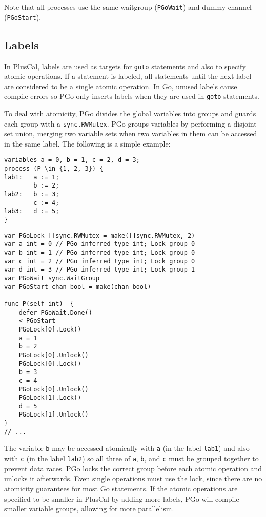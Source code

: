 Note that all processes use the same waitgroup (\texttt{PGoWait}) and dummy channel (\texttt{PGoStart}).

\subsection{Labels}
\label{sec:labels}
In PlusCal, labels are used as targets for \texttt{goto} statements and also to specify atomic operations. If a statement is labeled, all statements until the next label are considered to be a single atomic operation. In Go, unused labels cause compile errors so PGo only inserts labels when they are used in \texttt{goto} statements.

To deal with atomicity, PGo divides the global variables into groups and guards each group with a \texttt{sync.RWMutex}. PGo groups variables by performing a disjoint-set union, merging two variable sets when two variables in them can be accessed in the same label. The following is a simple example:

\begin{minipage}[t]{\textwidth}
\begin{lstlisting}[language=pcal]
variables a = 0, b = 1, c = 2, d = 3;
process (P \in {1, 2, 3}) {
lab1:   a := 1;
        b := 2;
lab2:   b := 3;
        c := 4;
lab3:   d := 5;
}
\end{lstlisting}
\end{minipage}

\begin{minipage}[t]{\textwidth}
\begin{lstlisting}[language=golang]
var PGoLock []sync.RWMutex = make([]sync.RWMutex, 2)
var a int = 0 // PGo inferred type int; Lock group 0
var b int = 1 // PGo inferred type int; Lock group 0
var c int = 2 // PGo inferred type int; Lock group 0
var d int = 3 // PGo inferred type int; Lock group 1
var PGoWait sync.WaitGroup
var PGoStart chan bool = make(chan bool)

func P(self int)  {
	defer PGoWait.Done()
	<-PGoStart
	PGoLock[0].Lock()
	a = 1
	b = 2
	PGoLock[0].Unlock()
	PGoLock[0].Lock()
	b = 3
	c = 4
	PGoLock[0].Unlock()
	PGoLock[1].Lock()
	d = 5
	PGoLock[1].Unlock()
}
// ...
\end{lstlisting}
\end{minipage}
The variable \texttt{b} may be accessed atomically with \texttt{a} (in the label \texttt{lab1}) and also with \texttt{c} (in the label \texttt{lab2}) so all three of \texttt{a}, \texttt{b}, and \texttt{c} must be grouped together to prevent data races. PGo locks the correct group before each atomic operation and unlocks it afterwards. Even single operations must use the lock, since there are no atomicity guarantees for most Go statements. If the atomic operations are specified to be smaller in PlusCal by adding more labels, PGo will compile smaller variable groups, allowing for more parallelism.

